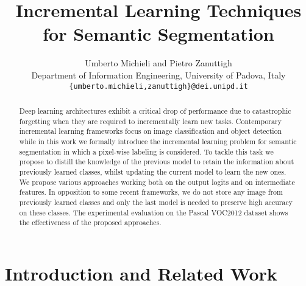 \documentclass[10pt,twocolumn,letterpaper]{article}
\begin{document}
\title{Incremental Learning Techniques for Semantic Segmentation}

\author{Umberto Michieli and Pietro Zanuttigh\\
Department of Information Engineering, University of Padova, Italy\\
{\tt\small \{umberto.michieli,zanuttigh\}@dei.unipd.it}
}

\maketitle
\ificcvfinal\thispagestyle{empty}\fi

\begin{abstract}
Deep learning architectures exhibit a critical drop of performance due to catastrophic forgetting when they are required to incrementally learn new tasks. Contemporary incremental learning frameworks focus  on image classification and object detection while in this work we formally introduce the incremental learning problem for semantic segmentation in which a pixel-wise labeling is considered. To tackle this task we propose to distill the knowledge of the previous model to retain the information about previously learned classes, whilst updating the current model to learn the new ones. We propose various approaches working both on the output logits and on intermediate features.  In opposition to some recent frameworks, we do not store any image from previously learned classes and only the last model is needed to preserve high accuracy on these classes. 
The experimental evaluation on the Pascal VOC2012 dataset shows the effectiveness of the proposed approaches. \end{abstract}



\section{Introduction and Related Work}
\label{sec:intro}
\end{document}
